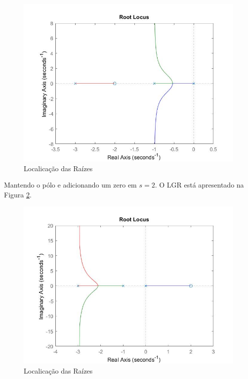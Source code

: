 \documentclass[
]{book}
\theoremstyle{definition}
\theoremstyle{definition}
\theoremstyle{definition}
\theoremstyle{remark}
\begin{document}
\begin{figure}

{\centering \includegraphics{Imagens/Lab8/Resolução/fig4c1} 

}

\caption{Localicação das Raízes}\label{fig:fig84c1}
\end{figure}

Mantendo o pólo e adicionando um zero em \(s = 2\). O LGR está apresentado na Figura \ref{fig:fig84c2}.

\begin{figure}

{\centering \includegraphics{Imagens/Lab8/Resolução/fig4c2} 

}

\caption{Localicação das Raízes}\label{fig:fig84c2}
\end{figure}
\end{document}
